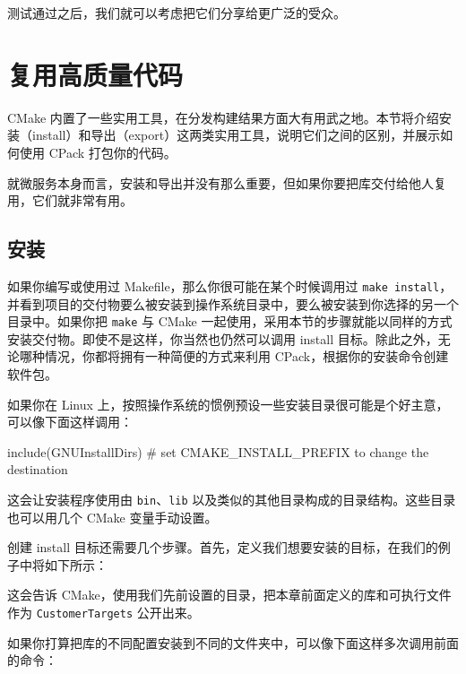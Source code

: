 \label{idx:697}
测试通过之后，我们就可以考虑把它们分享给更广泛的受众。

\section{复用高质量代码}

\label{idx:698}
CMake 内置了一些实用工具，在分发构建结果方面大有用武之地。本节将介绍安装（install）和导出（export）这两类实用工具，说明它们之间的区别，并展示如何使用 CPack 打包你的代码。

就微服务本身而言，安装和导出并没有那么重要，但如果你要把库交付给他人复用，它们就非常有用。

\subsection{安装}

\label{idx:699}
如果你编写或使用过 Makefile，那么你很可能在某个时候调用过 \texttt{make install}，并看到项目的交付物要么被安装到操作系统目录中，要么被安装到你选择的另一个目录中。如果你把 \texttt{make} 与 CMake 一起使用，采用本节的步骤就能以同样的方式安装交付物。即使不是这样，你当然也仍然可以调用 install 目标。除此之外，无论哪种情况，你都将拥有一种简便的方式来利用 CPack，根据你的安装命令创建软件包。

如果你在 Linux 上，按照操作系统的惯例预设一些安装目录很可能是个好主意，可以像下面这样调用：

\begin{codebox}[cmake]
include(GNUInstallDirs) # set CMAKE_INSTALL_PREFIX to change the destination
\end{codebox}

这会让安装程序使用由 \texttt{bin}、\texttt{lib} 以及类似的其他目录构成的目录结构。这些目录也可以用几个 CMake 变量手动设置。

创建 install 目标还需要几个步骤。首先，定义我们想要安装的目标，在我们的例子中将如下所示：


\label{idx:700}
这会告诉 CMake，使用我们先前设置的目录，把本章前面定义的库和可执行文件作为 \texttt{Customer\allowbreak{}Targets} 公开出来。

如果你打算把库的不同配置安装到不同的文件夹中，可以像下面这样多次调用前面的命令：

